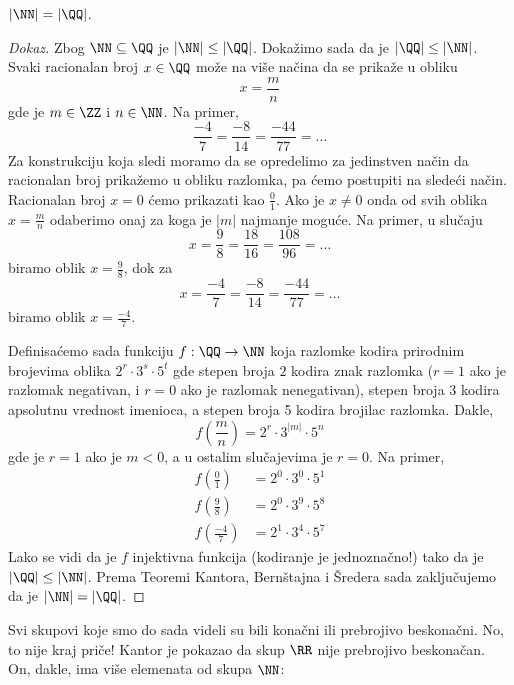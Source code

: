 \begin{THM}
  $|\NN| = |\QQ|$.
\end{THM}
\begin{proof}[Dokaz]
  Zbog $\NN \subseteq \QQ$ je $|\NN| \le |\QQ|$. Doka\v zimo sada da je $|\QQ| \le |\NN|$. Svaki racionalan broj
  $x \in \QQ$ mo\v ze na vi\v se na\v cina da se prika\v ze u obliku
  $$
    x = \frac mn
  $$
  gde je $m \in \ZZ$ i $n \in \NN$. Na primer,
  $$
    \frac{-4}{7} = \frac{-8}{14} = \frac{-44}{77} = \ldots
  $$
  Za konstrukciju koja sledi moramo da se opredelimo za jedinstven na\v cin da
  racionalan broj prika\v zemo u obliku razlomka, pa \'cemo postupiti na slede\'ci na\v cin.
  Racionalan broj $x = 0$ \'cemo prikazati kao $\frac 01$. Ako je $x \ne 0$ onda od svih oblika
  $
    x = \frac mn
  $
  odaberimo onaj za koga je $|m|$ najmanje mogu\'ce. Na primer, u slu\v caju
  $$
    x = \frac{9}{8} = \frac{18}{16} = \frac{108}{96} = \ldots
  $$
  biramo oblik $x = \frac{9}{8}$, dok za
  $$
    x = \frac{-4}{7} = \frac{-8}{14} = \frac{-44}{77} = \ldots
  $$
  biramo oblik $x = \frac{-4}{7}$.
  
  Definisa\'cemo sada funkciju $f : \QQ \to \NN$ koja razlomke kodira prirodnim brojevima oblika $2^r \cdot 3^s \cdot 5^t$
  gde stepen broja $2$ kodira znak razlomka ($r = 1$ ako je razlomak negativan, i $r = 0$ ako je razlomak nenegativan),
  stepen broja $3$ kodira apsolutnu vrednost imenioca, a stepen broja 5 kodira brojilac razlomka. Dakle,
  $$
    f(\textstyle\frac mn) = 2^r \cdot 3^{|m|} \cdot 5^n
  $$
  gde je $r = 1$ ako je $m < 0$, a u ostalim slu\v cajevima je $r = 0$. Na primer,
  \begin{align*}
    f(\textstyle\frac 01) &= 2^0 \cdot 3^0 \cdot 5^1\\[3mm]
    f(\textstyle\frac 98) &= 2^0 \cdot 3^9 \cdot 5^8\\[3mm]
    f(\textstyle\frac{-4}{7}) &= 2^1 \cdot 3^4 \cdot 5^7
  \end{align*}
  Lako se vidi da je $f$ injektivna funkcija (kodiranje je jednozna\v cno!) tako da je $|\QQ| \le |\NN|$. Prema
  Teoremi Kantora, Bern\v stajna i \v Sredera sada zaklju\v cujemo da je $|\NN| = |\QQ|$.
\end{proof}

Svi skupovi koje smo do sada videli su bili kona\v cni ili prebrojivo beskona\v cni. No, to nije kraj pri\v ce!
Kantor je pokazao da skup $\RR$ nije prebrojivo beskona\v can. On, dakle, ima vi\v se elemenata od skupa $\NN$:

